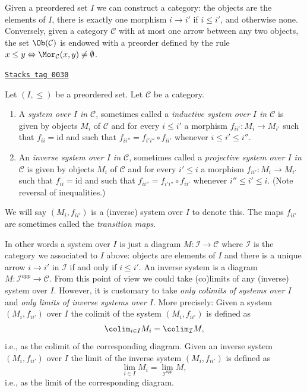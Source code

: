 \medskip\noindent
Given a preordered set $I$ we can construct a category: the objects are
the elements of $I$, there is exactly one morphism $i \to i'$
if $i \leq i'$, and otherwise none. Conversely, given a category $\mathcal{C}$
with at most one arrow between any two objects, the set
$\Ob(\mathcal{C})$ is endowed with a preorder defined by the rule
$x \leq y \Leftrightarrow \Mor_\mathcal{C}(x, y) \not = \emptyset$.

\begin{definition}
\label{categories-definition-system-over-poset}
\href{https://stacks.math.columbia.edu/tag/0030}{\texttt{Stacks tag 0030}}

Let $(I, \leq)$ be a preordered set. Let $\mathcal{C}$ be a category.
\begin{enumerate}
\item A {\it system over $I$ in $\mathcal{C}$}, sometimes called a
{\it inductive system over $I$ in $\mathcal{C}$} is given by
objects $M_i$ of $\mathcal{C}$ and for every $i \leq i'$ a
morphism $f_{ii'} : M_i \to M_{i'}$ such that $f_{ii}
= \text{id}$ and such that $f_{ii''} = f_{i'i''} \circ f_{i i'}$
whenever $i \leq i' \leq i''$.
\item An {\it inverse system over $I$ in $\mathcal{C}$},
sometimes called a {\it projective system over $I$ in $\mathcal{C}$}
is given by objects $M_i$ of $\mathcal{C}$ and for every $i' \leq i$ a
morphism $f_{ii'} : M_i \to M_{i'}$ such that $f_{ii}
= \text{id}$ and such that $f_{ii''} = f_{i'i''} \circ f_{i i'}$
whenever $i'' \leq i' \leq i$. (Note reversal of inequalities.)
\end{enumerate}
We will say $(M_i, f_{ii'})$ is a (inverse) system over $I$ to
denote this. The maps $f_{ii'}$ are sometimes
called the {\it transition maps}.
\end{definition}

In other words a system over $I$ is just a diagram
$M : \mathcal{I} \to \mathcal{C}$ where $\mathcal{I}$ is the category
we associated to $I$ above: objects are elements of $I$ and
there is a unique arrow $i \to i'$ in $\mathcal{I}$ if and only if $i \leq i'$.
An inverse system is a diagram $M : \mathcal{I}^{opp} \to \mathcal{C}$.
From this point of view we could take (co)limits of any (inverse)
system over $I$. However, it is customary to take
{\it only colimits of systems over $I$} and
{\it only limits of inverse systems over $I$}.
More precisely: Given a system $(M_i, f_{ii'})$
over $I$ the colimit of the system
$(M_i, f_{ii'})$ is defined as
$$
\colim_{i \in I} M_i = \colim_\mathcal{I} M,
$$
i.e., as the colimit of the corresponding diagram.
Given an inverse system $(M_i, f_{ii'})$ over $I$ the limit
of the inverse system $(M_i, f_{ii'})$ is defined as
$$
\lim_{i \in I} M_i = \lim_{\mathcal{I}^{opp}} M,
$$
i.e., as the limit of the corresponding diagram.

